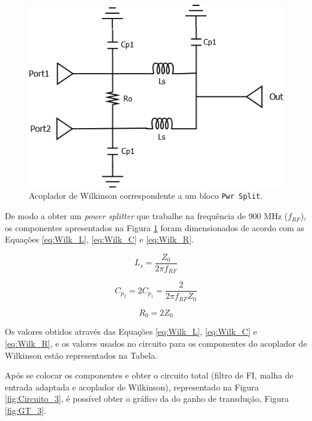 \documentclass[11pt]{article}
\numberwithin{equation}{section}
\begin{document}
\begin{figure}[h]
\centering
\includegraphics[keepaspectratio=true, scale=0.45]{teoricas/Wilkinson}
\vspace{-0.5em}
\caption{Acoplador de Wilkinson correspondente a um bloco \texttt{Pwr Split}.}
\vspace{-0.8em}
\label{fig:Wilk}
\end{figure}

De modo a obter um \textit{power splitter} que trabalhe na frequência de 900 MHz ($ f_{RF} $), os componentes apresentados na Figura \ref{fig:Wilk} foram dimensionados de acordo com as Equações \ref{eq:Wilk_L}, \ref{eq:Wilk_C} e \ref{eq:Wilk_R}. 

\begin{equation}
L_{s} = \frac{Z_{0}}{2 \pi f_{RF}}
\label{eq:Wilk_L}
\end{equation}

\begin{equation}
C_{p_{2}} = 2C_{p_{1}} = \frac{2}{2 \pi f_{RF}Z_{0}}
\label{eq:Wilk_C}
\end{equation}

\begin{equation}
R_{0}=2Z_{0}
\label{eq:Wilk_R}
\end{equation}

Os valores obtidos através das Equações \ref{eq:Wilk_L}, \ref{eq:Wilk_C} e \ref{eq:Wilk_R}, e os valores usados no circuito para os componentes do acoplador de Wilkinson estão representados na Tabela.


Após se colocar os componentes e obter o circuito total (filtro de FI, malha de entrada adaptada e acoplador de Wilkinson), representado na Figura \ref{fig:Circuito_3}, é possível obter o gráfico da do ganho de transdução, Figura \ref{fig:GT_3}.
\end{document}
